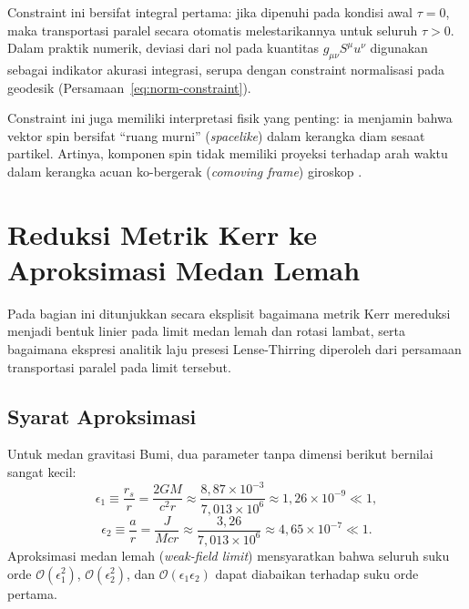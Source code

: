 Constraint ini bersifat integral pertama:
jika dipenuhi pada kondisi awal $\tau = 0$,
maka transportasi paralel secara otomatis melestarikannya
untuk seluruh $\tau > 0$.
Dalam praktik numerik, deviasi dari nol pada kuantitas
$g_{\mu\nu} S^\mu u^\nu$ digunakan sebagai indikator
akurasi integrasi, serupa dengan constraint normalisasi pada geodesik
(Persamaan~\ref{eq:norm-constraint}).

Constraint ini juga memiliki interpretasi fisik yang penting:
ia menjamin bahwa vektor spin bersifat ``ruang murni'' (\textit{spacelike})
dalam kerangka diam sesaat partikel.
Artinya, komponen spin tidak memiliki proyeksi terhadap arah waktu
dalam kerangka acuan ko-bergerak (\textit{comoving frame}) giroskop
\parencite{Misner1973Gravitation}.



\section{Reduksi Metrik Kerr ke Aproksimasi Medan Lemah}
\label{sec:medan-lemah}

Pada bagian ini ditunjukkan secara eksplisit bagaimana metrik Kerr
mereduksi menjadi bentuk linier pada limit medan lemah dan rotasi lambat,
serta bagaimana ekspresi analitik laju presesi Lense-Thirring diperoleh
dari persamaan transportasi paralel pada limit tersebut.


\subsection{Syarat Aproksimasi}
\label{subsec:syarat-aproksimasi}

Untuk medan gravitasi Bumi, dua parameter tanpa dimensi berikut bernilai sangat kecil:
\begin{equation}
    \epsilon_1 \equiv \frac{r_s}{r} = \frac{2GM}{c^2 r}
    \approx \frac{8{,}87 \times 10^{-3}}{7{,}013 \times 10^{6}}
    \approx 1{,}26 \times 10^{-9} \ll 1,
    \label{eq:eps1}
\end{equation}
\begin{equation}
    \epsilon_2 \equiv \frac{a}{r} = \frac{J}{Mcr}
    \approx \frac{3{,}26}{7{,}013 \times 10^{6}}
    \approx 4{,}65 \times 10^{-7} \ll 1.
    \label{eq:eps2}
\end{equation}
Aproksimasi medan lemah (\textit{weak-field limit})
mensyaratkan bahwa seluruh suku orde $\mathcal{O}(\epsilon_1^2)$,
$\mathcal{O}(\epsilon_2^2)$, dan $\mathcal{O}(\epsilon_1\epsilon_2)$
dapat diabaikan terhadap suku orde pertama.



